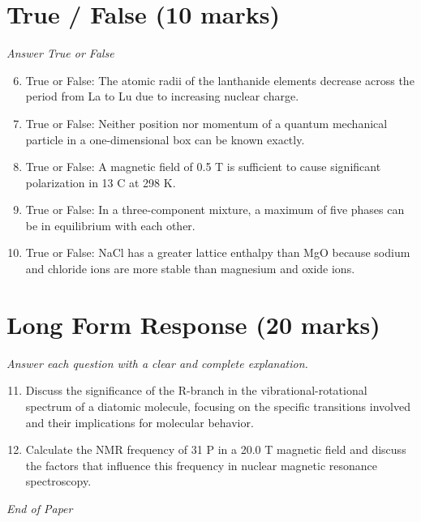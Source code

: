 \documentclass[12pt]{article}
\begin{document}
\section*{True / False (10 marks)}
\textit{Answer True or False}
\begin{enumerate}[label=\arabic*.]
\setcounter{enumi}{5}
\item True or False: The atomic radii of the lanthanide elements decrease across the period from La to Lu due to increasing nuclear charge.
\item True or False: Neither position nor momentum of a quantum mechanical particle in a one-dimensional box can be known exactly.
\item True or False: A magnetic field of 0.5 T is sufficient to cause significant polarization in 13 C at 298 K.
\item True or False: In a three-component mixture, a maximum of five phases can be in equilibrium with each other.
\item True or False: NaCl has a greater lattice enthalpy than MgO because sodium and chloride ions are more stable than magnesium and oxide ions.
\end{enumerate}

\section*{Long Form Response (20 marks)}
\textit{Answer each question with a clear and complete explanation.}
\begin{enumerate}[label=\arabic*.]
\setcounter{enumi}{10}
\item Discuss the significance of the R-branch in the vibrational-rotational spectrum of a diatomic molecule, focusing on the specific transitions involved and their implications for molecular behavior.
\item Calculate the NMR frequency of 31 P in a 20.0 T magnetic field and discuss the factors that influence this frequency in nuclear magnetic resonance spectroscopy.
\end{enumerate}

\vfill
\noindent\textit{End of Paper}
\end{document}
